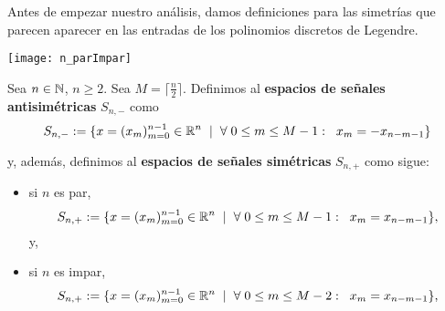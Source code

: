 Antes de empezar nuestro análisis, damos definiciones
para las simetrías que parecen aparecer en las entradas
de los polinomios discretos de Legendre.

\begin{marginfigure}
\texttt{[image: n\_parImpar]} 
\end{marginfigure}


\begin{defi}
\label{def: espacios de seniales simetricas y antisimetricas}
Sea $n \in \mathbb{N}$, $n \geq 2$. 
Sea $M = \lceil \frac{n}{2} \rceil$.
Definimos al 
\textbf{espacios de señales antisimétricas} $S_{n,-}$ como 
	\begin{equation}
	\label{eq1: 5Dic}
	S_{n, -}:= \{ x=(x_{m})_{m=0}^{n-1}  \in \mathbb{R}^{n}
	\hspace{0.2cm} |
	\hspace{0.2cm} \forall  
	\hspace{0.1cm}
	0 \leq m \leq M-1 : \hspace{0.2cm} x_{m}= -x_{n-m-1}\}
	\end{equation}

\noindent	
y, además, definimos al
\textbf{espacios de señales simétricas} $S_{n,+}$ como sigue:

\begin{itemize}
	\item si $n$ es par, 
	\begin{equation}
	\label{eq0: 5Dic}
	S_{n, +}:= \{ x=(x_{m})_{m=0}^{n-1} \in \mathbb{R}^{n} \hspace{0.2cm} 
	| \hspace{0.2cm} \forall  
	\hspace{0.1cm}
	0 \leq m \leq M-1 : \hspace{0.2cm} x_{m}= x_{n-m-1}\},
	\end{equation}
	y,
	
	\item si $n$ es impar,
	\begin{equation}
	\label{eq0: 17ap}
	S_{n, +}:= \{ x=(x_{m})_{m=0}^{n-1} \in \mathbb{R}^{n} \hspace{0.2cm} 
	| \hspace{0.2cm} \forall  
	\hspace{0.1cm}
	0 \leq m \leq M-2 : \hspace{0.2cm} x_{m}= x_{n-m-1}\},
	\end{equation}
	
\end{itemize}
\end{defi}


